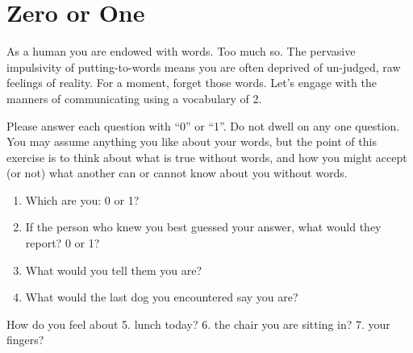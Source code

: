 \documentclass[
]{book}
\providecommand{\tightlist}{%
  \setlength{\itemsep}{0pt}\setlength{\parskip}{0pt}}
\begin{document}
\hypertarget{zero-or-one}{%
\chapter{Zero or One}\label{zero-or-one}}

As a human you are endowed with words.
Too much so. The pervasive impulsivity of putting-to-words means you are often deprived
of un-judged, raw feelings of reality.
For a moment, forget those words.
Let's engage with the manners of communicating
using a vocabulary of 2.

Please answer each question with ``0'' or ``1''.
Do not dwell on any one question.
You may assume anything you like about your words,
but the point of this exercise is to think about what is true without words, and how you might accept (or not)
what another can or cannot know about you without words.

\begin{enumerate}
\def\labelenumi{\arabic{enumi}.}
\tightlist
\item
  Which are you: 0 or 1?
\item
  If the person who knew you best guessed your answer,
  what would they report? 0 or 1?
\item
  What would you tell them you are?
\item
  What would the last dog you encountered say you are?
\end{enumerate}

How do you feel about
5. lunch today?
6. the chair you are sitting in?
7. your fingers?
\end{document}
